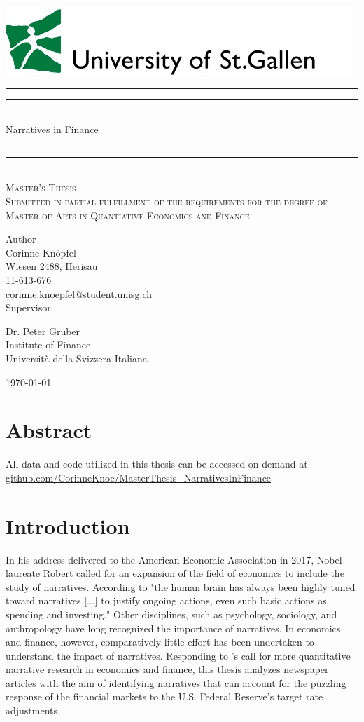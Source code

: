 \documentclass[11pt,a4paper,english,oneside]{book}
\makeatletter
\newcommand{\githubSymbol}{\faGithub}
\newcommand\link[2]{\color{black}\href{#1}{#2}\color{black} }
\newcommand*{\github}[1]{\sociallink{\githubSymbol}{https://www.github.com/#1}{github.com/#1}}
\newcommand{\sociallink}[3]{\mbox{\textcolor{black}{#1}\hspace{0.5em}\link{#2}{#3}\hspace{1em}}}
\newcommand*{\plogo}{\includegraphics[scale=0.7]{Images/HSG_logo}}
\numberwithin{equation}{chapter}
\newcommand*{\titleGP}{\begingroup %
\centering %
\vspace*{\baselineskip} %
\plogo\\[2\baselineskip] %
\rule{\textwidth}{1.6pt}\vspace*{-\baselineskip}\vspace*{2pt} %
\rule{\textwidth}{0.4pt}\\[\baselineskip] %
{\LARGE Narratives in Finance }\\[0.2\baselineskip] %
\rule{\textwidth}{0.4pt}\vspace*{-\baselineskip}\vspace{3.2pt} %
\rule{\textwidth}{1.6pt}\\[2\baselineskip] %
\scshape %
Master's Thesis\\[2\baselineskip]
Submitted in partial fulfillment of the requirements for the degree of Master of Arts in Quantiative Economics and Finance \par
\vspace*{2\baselineskip}
Author\\
{\Large Corinne Knöpfel \\ [5pt]
 }
Wiesen 2488, Herisau \\[5pt]
11-613-676\\[5pt]
corinne.knoepfel@student.unisg.ch \\


\vspace*{2\baselineskip}
Supervisor\\
{\Large Dr. Peter Gruber\\[5pt]%
\small Institute of Finance\\[5pt]Universit\`{a} della Svizzera Italiana\par}
\vfill
{\scshape %
	\today } \\[0.3\baselineskip]
\endgroup}
\makeatother
\begin{document}
\thispagestyle{empty}
\titleGP
\newpage
\doublespacing
\setcounter{page}{1}
\thispagestyle{firststyle}


\chapter*{Abstract}

\vspace*{\fill}

All data and code utilized in this thesis can be accessed on demand at\\
\noindent \github{CorinneKnoe/MasterThesis\_NarrativesInFinance}



{\pagestyle{firststyle}
\tableofcontents
\cleardoublepage
}

\listoffigures
\listoftables

\newpage


\chapter{Introduction}
In his address delivered to the American Economic Association in 2017, Nobel laureate Robert \citeauthor{Shiller.2017} called for an expansion of the field of economics to include the study of narratives. According to \citeauthor{Shiller.2017} "the human brain has always been highly tuned toward narratives [...] to justify ongoing actions, even such basic actions as spending and investing." Other disciplines, such as psychology, sociology, and anthropology have long recognized the importance of narratives. In economics and finance, however, comparatively little effort has been undertaken to understand the impact of narratives. Responding to \citeauthor{Shiller.2017}'s call for more quantitative narrative research in economics and finance, this thesis analyzes newspaper articles with the aim of identifying narratives that can account for the puzzling response of the financial markets to the U.S. Federal Reserve's target rate adjustments. 
\end{document}
